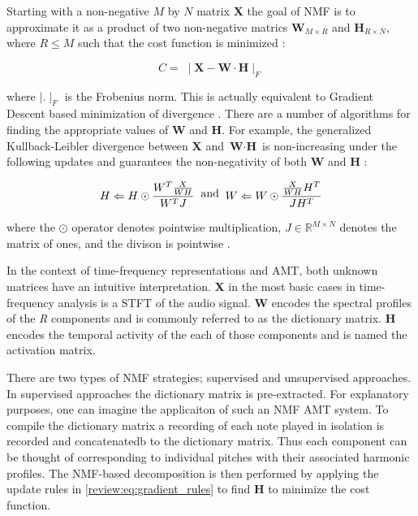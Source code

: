 Starting with a non-negative $M$ by $N$ matrix \textbf{X} the goal of \ac{NMF} is to
approximate it as a product of two non-negative matrics $ \textbf{W}_{M \times
    R}$ and $\textbf{H}_{R \times N}$, where $R \leq M$ such that the cost function is
minimized :

\begin{equation}
  C = \;\mid \textbf{X} - \textbf{W}\cdot \textbf{H} \mid _ {F}
\end{equation}

where $\mid . \mid_{F}$ is the Frobenius norm. This is actually equivalent to
Gradient Descent based minimization of divergence \cite{nmfamt2003:Smaragdis}.
There are a number of algorithms for finding the appropriate values of
\textbf{W} and \textbf{H}. For example, the generalized Kullback-Leibler
divergence between \textbf{X} and $\textbf{W}\cdot \textbf{H}$ is non-increasing
under the following updates and guarantees the non-negativity of both \textbf{W}
and \textbf{H} :

\begin{equation}
  \begin{split}
    H \Leftarrow H \odot \frac{W^{T}\frac{X}{WH}}{W^{T}J}
  \end{split}
  \text{\;\;and\;\;}
  \begin{split}
    W \Leftarrow W \odot \frac{\frac{X}{WH}H^{T}}{JH^{T}}
  \end{split}
  \label{review:eq:gradient_rules}
\end{equation}

where the $\odot$ operator denotes pointwise multiplication, $J \in
  \mathbb{R}^{M \times N}$ denotes the matrix of ones, and the divison is
pointwise \cite{amt2019:Benetos}.

In the context of time-frequency representations and \ac{AMT}, both unknown matrices
have an intuitive interpretation. \textbf{X} in the most basic cases in
time-frequency analysis is a \ac{STFT} of the audio signal. \textbf{W} encodes the
spectral profiles of the \emph{R} components and is commonly referred to as the
dictionary matrix. \textbf{H} encodes the temporal activity of the each of those
components and is named the activation matrix.

There are two types of \ac{NMF} strategies; supervised and
unsupervised approaches. In supervised approaches the dictionary matrix is
pre-extracted. For explanatory purposes, one can imagine the applicaiton of such
an \ac{NMF} \ac{AMT} system. To compile the dictionary matrix a recording of each note
played in isolation is recorded and concatenatedb to the dictionary matrix. Thus each component can be
thought of corresponding to individual pitches with their associated harmonic
profiles. The \ac{NMF}-based decomposition is then performed by applying the update
rules in \autoref{review:eq:gradient_rules} to find \textbf{H} to minimize the
cost function.

